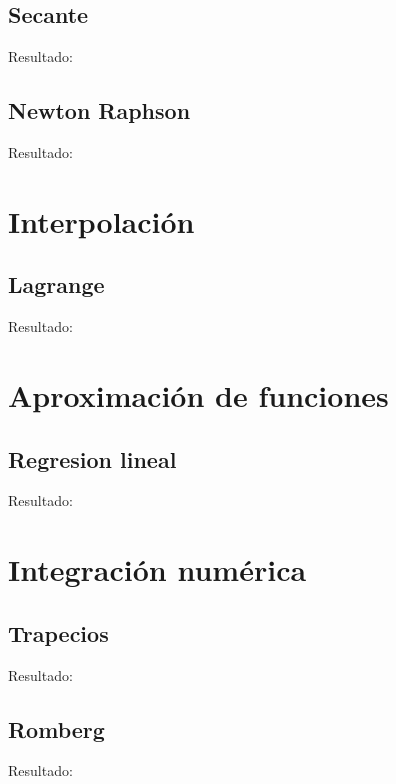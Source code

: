 \documentclass[a4paper,10pt]{article}
\begin{document}
		\subsection{Secante}
 			
 			Resultado:
 			

		\subsection{Newton Raphson}
 			
 			Resultado:
 			

	\section{Interpolaci\'on}

		\subsection{Lagrange}
 			
 			Resultado:
 			

	\section{Aproximaci\'on de funciones}

		\subsection{Regresion lineal}
 			
 			Resultado:
 			

	\section{Integraci\'on num\'erica}

		\subsection{Trapecios}
 			
 			Resultado:
 			

		\subsection{Romberg}
 			
 			Resultado:
 			
\end{document}
